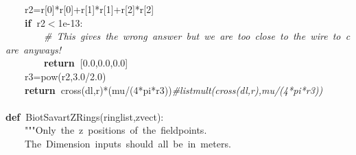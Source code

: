 \documentclass{article}
\newcommand{\hlstd}[1]{\textcolor[rgb]{0,0,0}{#1}}
\newcommand{\hlnum}[1]{\textcolor[rgb]{0.16,0.16,1}{#1}}
\newcommand{\hlstr}[1]{\textcolor[rgb]{1,0,0}{#1}}
\newcommand{\hlslc}[1]{\textcolor[rgb]{0.51,0.51,0.51}{\it{#1}}}
\newcommand{\hlsym}[1]{\textcolor[rgb]{0,0,0}{#1}}
\newcommand{\hlkwa}[1]{\textcolor[rgb]{0,0,0}{\bf{#1}}}
\newcommand{\hlkwb}[1]{\textcolor[rgb]{0.51,0,0}{#1}}
\newcommand{\hlkwd}[1]{\textcolor[rgb]{0,0,0.51}{#1}}
\begin{document}
\hlstd{}\hlstd{\ \ \ \ }\hlstd{r2}\hlsym{=}\hlstd{r}\hlsym{{[}}\hlstd{}\hlnum{0}\hlstd{}\hlsym{{]}{*}}\hlstd{r}\hlsym{{[}}\hlstd{}\hlnum{0}\hlstd{}\hlsym{{]}+}\hlstd{r}\hlsym{{[}}\hlstd{}\hlnum{1}\hlstd{}\hlsym{{]}{*}}\hlstd{r}\hlsym{{[}}\hlstd{}\hlnum{1}\hlstd{}\hlsym{{]}+}\hlstd{r}\hlsym{{[}}\hlstd{}\hlnum{2}\hlstd{}\hlsym{{]}{*}}\hlstd{r}\hlsym{{[}}\hlstd{}\hlnum{2}\hlstd{}\hlsym{{]}}\hspace*{\fill}\\
\hlstd{}\hlstd{\ \ \ \ }\hlstd{}\hlkwa{if\ }\hlstd{r2}\hlsym{$<$}\hlstd{}\hlnum{1e{-}13}\hlstd{}\hlsym{:}\hspace*{\fill}\\
\hlstd{}\hlstd{\ \ \ \ \ \ \ \ }\hlstd{}\hlslc{\#\ This\ gives\ the\ wrong\ answer\ but\ we\ are\ too\ close\ to\ the\ wire\ to\ care\ anyways!}\hspace*{\fill}\\
\hlstd{}\hlstd{\ \ \ \ \ \ \ \ }\hlstd{}\hlkwa{return\ }\hlstd{}\hlsym{{[}}\hlstd{}\hlnum{0.0}\hlstd{}\hlsym{,}\hlstd{}\hlnum{0.0}\hlstd{}\hlsym{,}\hlstd{}\hlnum{0.0}\hlstd{}\hlsym{{]}}\hspace*{\fill}\\
\hlstd{}\hlstd{\ \ \ \ }\hlstd{r3}\hlsym{=}\hlstd{}\hlkwb{pow}\hlstd{}\hlsym{(}\hlstd{r2}\hlsym{,}\hlstd{}\hlnum{3.0}\hlstd{}\hlsym{/}\hlstd{}\hlnum{2.0}\hlstd{}\hlsym{)}\hspace*{\fill}\\
\hlstd{}\hlstd{\ \ \ \ }\hlstd{}\hlkwa{return\ }\hlstd{}\hlkwd{cross}\hlstd{}\hlsym{(}\hlstd{dl}\hlsym{,}\hlstd{r}\hlsym{){*}(}\hlstd{mu}\hlsym{/(}\hlstd{}\hlnum{4}\hlstd{}\hlsym{{*}}\hlstd{pi}\hlsym{{*}}\hlstd{r3}\hlsym{))}\hlstd{}\hlslc{\#listmult(\textunderscore cross(dl,r),mu\textunderscore 0/(4{*}pi{*}r3))}\hspace*{\fill}\\
\hlstd{}\hspace*{\fill}\\
\hlkwa{def\ }\hlstd{}\hlkwd{Biot\textunderscore Savart\textunderscore ZRings}\hlstd{}\hlsym{(}\hlstd{ringlist}\hlsym{,}\hlstd{zvect}\hlsym{):}\hspace*{\fill}\\
\hlstd{}\hlstd{\ \ \ \ }\hlstd{}\hlstr{"""Only\ the\ z\ positions\ of\ the\ fieldpoints.}\hspace*{\fill}\\
\hlstr{}\hlstd{\ \ \ \ }\hlstr{The\ Dimension\ inputs\ should\ all\ be\ in\ meters.}\hspace*{\fill}\\
\end{document}
